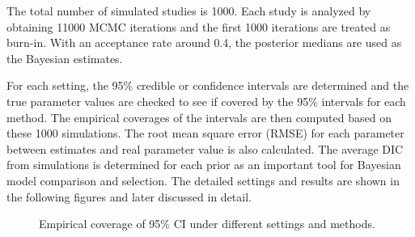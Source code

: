 \documentclass[Proceedings]{ascelike}
\begin{document}
The total number of simulated studies is 1000. Each study is analyzed
by obtaining 11000 MCMC iterations and the first 1000 iterations are
treated as burn-in. With an acceptance rate around 0.4, the posterior
medians are used as the Bayesian estimates.

For each setting, the 95\% credible or confidence intervals are
determined and the true parameter values are checked to see if covered
by the 95\% intervals for each method. The empirical coverages of the
intervals are then computed based on these 1000 simulations. The root
mean square error (RMSE) for each parameter between estimates and real
parameter value is also calculated. The average DIC from simulations
is determined for each prior as an important tool for Bayesian model
comparison and selection. The detailed settings and results are shown
in the following figures and later discussed in detail.

\begin{figure}[h!]
\centering
{}
\caption{Empirical coverage of 95\% CI under different settings and methods.}
\label{fig:anova_coverage}
\end{figure}
\end{document}
